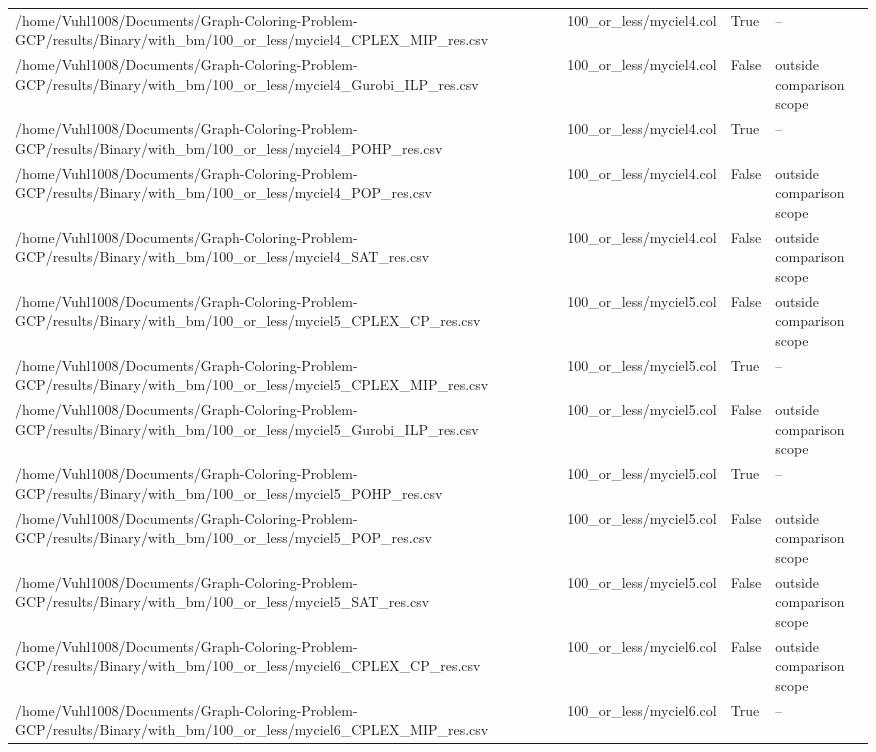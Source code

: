 \begin{table}[htbp]
\begin{tabular}{llll}
/home/Vuhl1008/Documents/Graph-Coloring-Problem-GCP/results/Binary/with\_bm/100\_or\_less/myciel4\_CPLEX\_MIP\_res.csv & 100\_or\_less/myciel4.col & True & -- \\
/home/Vuhl1008/Documents/Graph-Coloring-Problem-GCP/results/Binary/with\_bm/100\_or\_less/myciel4\_Gurobi\_ILP\_res.csv & 100\_or\_less/myciel4.col & False & outside comparison scope \\
/home/Vuhl1008/Documents/Graph-Coloring-Problem-GCP/results/Binary/with\_bm/100\_or\_less/myciel4\_POHP\_res.csv & 100\_or\_less/myciel4.col & True & -- \\
/home/Vuhl1008/Documents/Graph-Coloring-Problem-GCP/results/Binary/with\_bm/100\_or\_less/myciel4\_POP\_res.csv & 100\_or\_less/myciel4.col & False & outside comparison scope \\
/home/Vuhl1008/Documents/Graph-Coloring-Problem-GCP/results/Binary/with\_bm/100\_or\_less/myciel4\_SAT\_res.csv & 100\_or\_less/myciel4.col & False & outside comparison scope \\
/home/Vuhl1008/Documents/Graph-Coloring-Problem-GCP/results/Binary/with\_bm/100\_or\_less/myciel5\_CPLEX\_CP\_res.csv & 100\_or\_less/myciel5.col & False & outside comparison scope \\
/home/Vuhl1008/Documents/Graph-Coloring-Problem-GCP/results/Binary/with\_bm/100\_or\_less/myciel5\_CPLEX\_MIP\_res.csv & 100\_or\_less/myciel5.col & True & -- \\
/home/Vuhl1008/Documents/Graph-Coloring-Problem-GCP/results/Binary/with\_bm/100\_or\_less/myciel5\_Gurobi\_ILP\_res.csv & 100\_or\_less/myciel5.col & False & outside comparison scope \\
/home/Vuhl1008/Documents/Graph-Coloring-Problem-GCP/results/Binary/with\_bm/100\_or\_less/myciel5\_POHP\_res.csv & 100\_or\_less/myciel5.col & True & -- \\
/home/Vuhl1008/Documents/Graph-Coloring-Problem-GCP/results/Binary/with\_bm/100\_or\_less/myciel5\_POP\_res.csv & 100\_or\_less/myciel5.col & False & outside comparison scope \\
/home/Vuhl1008/Documents/Graph-Coloring-Problem-GCP/results/Binary/with\_bm/100\_or\_less/myciel5\_SAT\_res.csv & 100\_or\_less/myciel5.col & False & outside comparison scope \\
/home/Vuhl1008/Documents/Graph-Coloring-Problem-GCP/results/Binary/with\_bm/100\_or\_less/myciel6\_CPLEX\_CP\_res.csv & 100\_or\_less/myciel6.col & False & outside comparison scope \\
/home/Vuhl1008/Documents/Graph-Coloring-Problem-GCP/results/Binary/with\_bm/100\_or\_less/myciel6\_CPLEX\_MIP\_res.csv & 100\_or\_less/myciel6.col & True & -- \\

\end{tabular}
\end{table}
